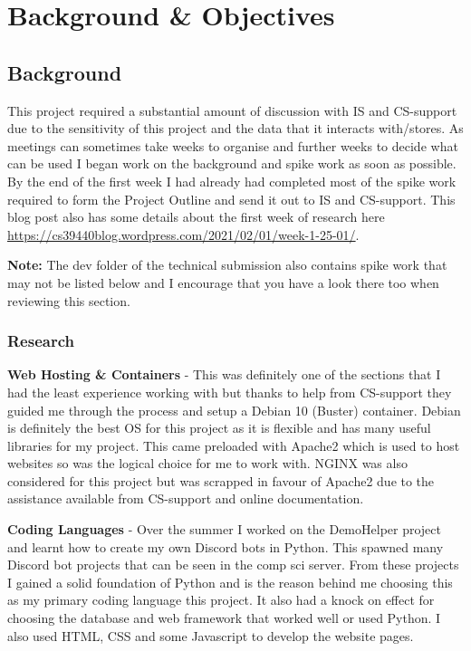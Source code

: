 \chapter{Background \& Objectives} 

\section{Background}

This project required a substantial amount of discussion with IS and CS-support due to the sensitivity of this project and the data that it interacts with/stores. As meetings can sometimes take weeks to organise and further weeks to decide what can be used I began work on the background and spike work as soon as possible. By the end of the first week I had already had completed most of the spike work required to form the Project Outline and send it out to IS and CS-support. This blog post also has some details about the first week of research here \href{https://cs39440blog.wordpress.com/2021/02/01/week-1-25-01/}{https://cs39440blog.wordpress.com/2021/02/01/week-1-25-01/}.

\textbf{Note:} The dev folder of the technical submission also contains spike work that may not be listed below and I encourage that you have a look there too when reviewing this section.

\subsection{Research}\label{sec1:Research}
\textbf{Web Hosting \& Containers} - This was definitely one of the sections that I had the least experience working with but thanks to help from CS-support they guided me through the process and setup a Debian 10 (Buster) \cite{debian} container. Debian is definitely the best OS for this project as it is flexible and has many useful libraries for my project. This came preloaded with Apache2 \cite{apache2} which is used to host websites so was the logical choice for me to work with. NGINX \cite{nginx} was also considered for this project but was scrapped in favour of Apache2 due to the assistance available from CS-support and online documentation. 

\textbf{Coding Languages} -  Over the summer I worked on the DemoHelper \cite{demohelper} project and learnt how to create my own Discord bots in Python. This spawned many Discord bot projects that can be seen in the comp sci server. From these projects I gained a solid foundation of Python and is the reason behind me choosing this as my primary coding language this project. It also had a knock on effect for choosing the database and web framework that worked well or used Python. I also used HTML, CSS and some Javascript to develop the website pages.


